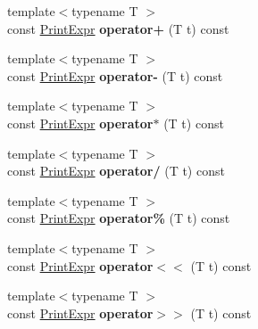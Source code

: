 \begin{DoxyCompactItemize}
\item 
\hypertarget{classPrintExpr_acfd705ab100ac58b066f7823c2c9d117}{{\footnotesize template$<$typename T $>$ }\\const \hyperlink{classPrintExpr}{Print\-Expr} {\bfseries operator+} (T t) const }\label{classPrintExpr_acfd705ab100ac58b066f7823c2c9d117}

\item 
\hypertarget{classPrintExpr_a44da6da34b92f6fa2cc28c483717b21f}{{\footnotesize template$<$typename T $>$ }\\const \hyperlink{classPrintExpr}{Print\-Expr} {\bfseries operator-\/} (T t) const }\label{classPrintExpr_a44da6da34b92f6fa2cc28c483717b21f}

\item 
\hypertarget{classPrintExpr_a147efe242acccf6e06dcbfd5f041e359}{{\footnotesize template$<$typename T $>$ }\\const \hyperlink{classPrintExpr}{Print\-Expr} {\bfseries operator$\ast$} (T t) const }\label{classPrintExpr_a147efe242acccf6e06dcbfd5f041e359}

\item 
\hypertarget{classPrintExpr_aa03eab3fe2e4da88bf4db4c0d4ad6c77}{{\footnotesize template$<$typename T $>$ }\\const \hyperlink{classPrintExpr}{Print\-Expr} {\bfseries operator/} (T t) const }\label{classPrintExpr_aa03eab3fe2e4da88bf4db4c0d4ad6c77}

\item 
\hypertarget{classPrintExpr_a222c337f6a22f82572657a3065efbb74}{{\footnotesize template$<$typename T $>$ }\\const \hyperlink{classPrintExpr}{Print\-Expr} {\bfseries operator\%} (T t) const }\label{classPrintExpr_a222c337f6a22f82572657a3065efbb74}

\item 
\hypertarget{classPrintExpr_a0c8aec39de660997774341edcc500215}{{\footnotesize template$<$typename T $>$ }\\const \hyperlink{classPrintExpr}{Print\-Expr} {\bfseries operator$<$$<$} (T t) const }\label{classPrintExpr_a0c8aec39de660997774341edcc500215}

\item 
\hypertarget{classPrintExpr_a444c58cf9d035e7ad00e3014c58bf61b}{{\footnotesize template$<$typename T $>$ }\\const \hyperlink{classPrintExpr}{Print\-Expr} {\bfseries operator$>$$>$} (T t) const }\label{classPrintExpr_a444c58cf9d035e7ad00e3014c58bf61b}


\end{DoxyCompactItemize}
